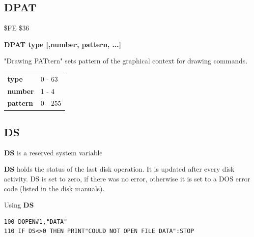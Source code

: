 
\newpage
\subsection{DPAT}
\begin{description}[leftmargin=2cm,style=nextline]
\item [Token:] \$FE \$36
\item [Format:] {\bf DPAT type [,number, pattern, ...]}
\item [Usage:]
   "Drawing PATtern" sets pattern
   of the graphical context for drawing commands.

\ttfamily
\begin{tabular}{|l|l|}
\hline
   {\bf type}       &  0 - 63 \\
   {\bf number}     &  1 - 4 \\
   {\bf pattern}    &  0 - 255 \\
\hline
\end{tabular}
\end{description}


\newpage
\subsection{DS}
\begin{description}[leftmargin=2cm,style=nextline]
\item [Format:] {\bf DS} is a reserved system variable
\item [Usage:]  {\bf DS} holds the status of the last disk operation.
                It is updated after every disk activity.
                DS is set to zero, if there was no error, otherwise
                it is set to a DOS error code (listed in the
                disk manuals).

\item [Example:] Using {\bf DS}
\begin{tcolorbox}[colback=black,coltext=white]
\verbatimfont{\codefont}
\begin{verbatim}
100 DOPEN#1,"DATA"
110 IF DS<>0 THEN PRINT"COULD NOT OPEN FILE DATA":STOP
\end{verbatim}
\end{tcolorbox}
\end{description}


